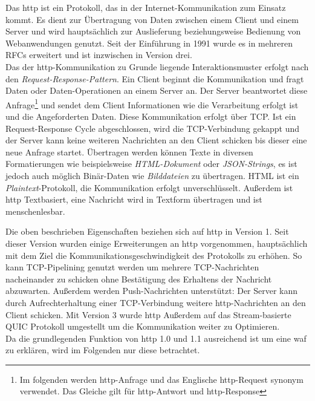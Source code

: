 Das \ac{http} ist ein Protokoll, das in der Internet-Kommunikation zum Einsatz kommt.
Es dient zur Übertragung von Daten zwischen einem Client und einem Server und wird hauptsächlich zur Auslieferung beziehungsweise Bedienung von Webanwendungen genutzt.
Seit der Einführung in 1991 wurde es in mehreren RFCs erweitert und ist inzwischen in Version drei\cite{onlineIETFErhebtHTTP2022}.\\

Das der \ac{http}-Kommunikation zu Grunde liegende Interaktionsmuster erfolgt nach den \textit{Request-Response-Pattern}.
Ein Client beginnt die Kommunikation und fragt Daten oder Daten-Operationen an einem Server an.
Der Server beantwortet diese Anfrage\footnote{Im folgenden werden \ac{http}-Anfrage und das Englische \ac{http}-Request synonym verwendet. Das Gleiche gilt für \ac{http}-Antwort und \ac{http}-Response} und sendet dem Client Informationen wie die Verarbeitung erfolgt ist und die Angeforderten Daten.
Diese Kommunikation erfolgt über TCP.
Ist ein Request-Response Cycle abgeschlossen, wird die TCP-Verbindung gekappt und der Server kann keine weiteren Nachrichten an den Client schicken bis dieser eine neue Anfrage startet.
Übertragen werden können Texte in diversen Formatierungen wie beispielsweise \textit{HTML-Dokument} oder \textit{JSON-Strings}, es ist jedoch auch möglich Binär-Daten wie \textit{Bilddateien} zu übertragen.
HTML ist ein \textit{Plaintext}-Protokoll, die Kommunikation erfolgt unverschlüsselt.
Außerdem ist \ac{http} Textbasiert, eine Nachricht wird in Textform übertragen und ist menschenlesbar.

Die oben beschrieben Eigenschaften beziehen sich auf \ac{http} in Version 1.
Seit dieser Version wurden einige Erweiterungen an \ac{http} vorgenommen, hauptsächlich mit dem Ziel die Kommunikationsgeschwindigkeit des Protokolls zu erhöhen.
So kann TCP-Pipelining genutzt werden um mehrere TCP-Nachrichten nacheinander zu schicken ohne Bestätigung des Erhaltens der Nachricht abzuwarten.
Außerdem werden Push-Nachrichten unterstützt:
Der Server kann durch Aufrechterhaltung einer TCP-Verbindung weitere \ac{http}-Nachrichten an den Client schicken.
Mit Version 3 wurde \ac{http} Außerdem auf das Stream-basierte QUIC Protokoll umgestellt um die Kommunikation weiter zu Optimieren\cite{OverviewHTTPHTTP2023}.\\

Da die grundlegenden Funktion von \ac{http} 1.0 und 1.1 ausreichend ist um eine \ac{waf} zu erklären, wird im Folgenden nur diese betrachtet.

